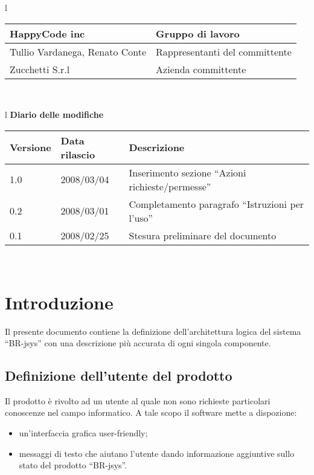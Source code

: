 \begin{center}
\begin{table}[hbtp]
{\begin{tabular}{l}
\begin{tabular}{||p{6cm}||p{6cm}||} \hline
{HappyCode inc}& Gruppo di lavoro\\ \hline
{Tullio Vardanega, Renato Conte}& Rappresentanti del committente \\ \hline
{Zucchetti S.r.l}& Azienda committente\\ \hline
\end{tabular} \\
\end{tabular}
}
\end{table}
\begin{table}[hbtp]
\large{
\begin{tabular}{l}
\Large{\textbf{\textsf{Diario delle modifiche}}} \\
\begin{tabular}{||p{2cm}||p{3.5cm}||p{6cm}||} \hline
\textbf{Versione} & \textbf{Data rilascio} & \textbf{Descrizione} \\ \hline
1.0 & 2008/03/04 & Inserimento sezione ``Azioni richieste/permesse'' \\ \hline
0.2 & 2008/03/01 & Completamento paragrafo ``Istruzioni per l'uso'' \\ \hline
0.1 & 2008/02/25 & Stesura preliminare del documento \\ \hline

\end{tabular} \\
\end{tabular}

}
\end{table}
\end{center}
\newpage

\tableofcontents 

\chapter{Introduzione}
Il presente documento contiene la definizione dell'architettura logica del sistema ``BR-jsys'' con una descrizione pi\`u accurata di ogni singola componente.
\section{Definizione dell'utente del prodotto}
Il prodotto \`e rivolto ad un utente al quale non sono richieste particolari conoscenze nel campo informatico. A tale scopo il software mette a dispozione:
\begin{itemize}
\item un'interfaccia grafica user-friendly;
\item messaggi di testo che aiutano l'utente dando informazione aggiuntive sullo stato del prodotto ``BR-jsys''.
\end{itemize}
